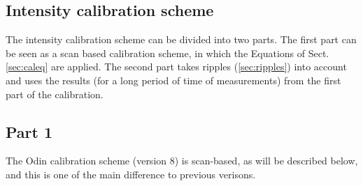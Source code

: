 \subsection{Intensity calibration scheme} 
\label{sec:calscheme}

The intensity calibration scheme can be divided into two parts. The first part can be
seen as a scan based calibration scheme, in which the Equations of Sect.\ref{sec:caleq} are applied.
The second part takes ripples (\ref{sec:ripples}) into account and uses the results
(for a long period of time of measurements) from the first part of the calibration.


\subsection*{Part 1}

The Odin calibration scheme (version 8) is scan-based, as will be described below, and
this is one of the main difference to previous verisons. 

